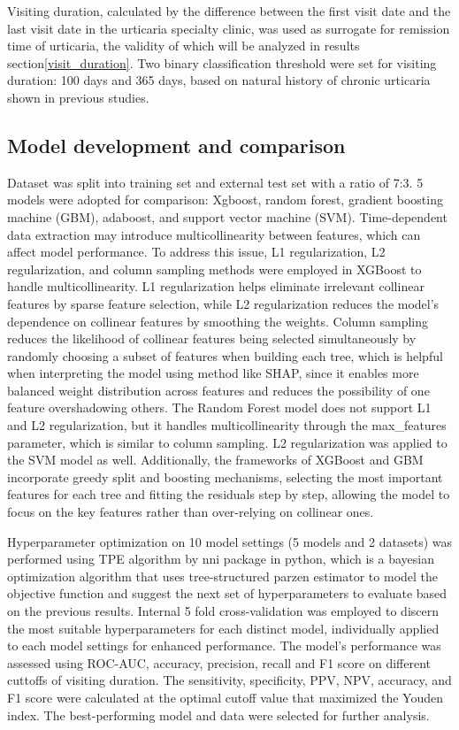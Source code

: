 \documentclass[final,3p,times,authoryear]{elsarticle}
\begin{document}
Visiting duration, calculated by the difference between the first visit date and the last visit date in the urticaria specialty clinic, was used as surrogate for remission time of urticaria, the validity of which will be analyzed in results section\ref{visit_duration}. Two binary classification threshold were set for visiting duration: 100 days and 365 days, based on natural history of chronic urticaria shown in previous studies\citep{eun2019natural,curto2018clinical,gaig2004epiodemiology}.

\subsection{Model development and comparison}\label{Training}
Dataset was split into training set and external test set with a ratio of 7:3. 5 models were adopted for comparison: Xgboost, random forest, gradient boosting machine (GBM), adaboost, and support vector machine (SVM). Time-dependent data extraction may introduce multicollinearity between features, which can affect model performance. To address this issue, L1 regularization, L2 regularization, and column sampling methods were employed in XGBoost to handle multicollinearity. L1 regularization helps eliminate irrelevant collinear features by sparse feature selection, while L2 regularization reduces the model's dependence on collinear features by smoothing the weights. Column sampling reduces the likelihood of collinear features being selected simultaneously by randomly choosing a subset of features when building each tree, which is helpful when interpreting the model using method like SHAP, since it enables more balanced weight distribution across features and reduces the possibility of one feature overshadowing others. The Random Forest model does not support L1 and L2 regularization, but it handles multicollinearity through the max\_features parameter, which is similar to column sampling. L2 regularization was applied to the SVM model as well. Additionally, the frameworks of XGBoost and GBM incorporate greedy split and boosting mechanisms, selecting the most important features for each tree and fitting the residuals step by step, allowing the model to focus on the key features rather than over-relying on collinear ones. 

Hyperparameter optimization on 10 model settings (5 models and 2 datasets) was performed using TPE algorithm by nni package in python, which is a bayesian optimization algorithm that uses tree-structured parzen estimator to model the objective function and suggest the next set of hyperparameters to evaluate based on the previous results. Internal 5 fold cross-validation was employed to discern the most suitable hyperparameters for each distinct model, individually applied to each model settings for enhanced performance. The model's performance was assessed using ROC-AUC, accuracy, precision, recall and F1 score on different cuttoffs of visiting duration. The sensitivity, specificity, PPV, NPV, accuracy, and F1 score were calculated at the optimal cutoff value that maximized the Youden index. The best-performing model and data were selected for further analysis.
\end{document}

